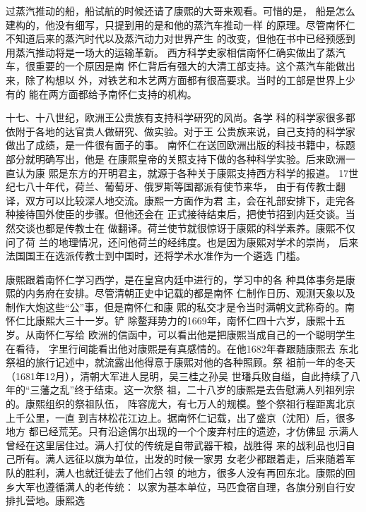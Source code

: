 过蒸汽推动的船，船试航的时候还请了康熙的大哥来观看。可惜的是，%
船是怎么建构的，他没有细写，只提到用的是和他的蒸汽车推动一样%
的原理。尽管南怀仁不知道后来的蒸汽时代以及蒸汽动力对世界产生%
的改变，但他在书中已经预感到用蒸汽推动将是一场大的运输革新。%
西方科学史家相信南怀仁确实做出了蒸汽车，很重要的一个原因是南%
怀仁背后有强大的大清工部支持。这个蒸汽车能做出来，除了构想以%
外，对铁艺和木艺两方面都有很高要求。当时的工部是世界上少有的%
能在两方面都给予南怀仁支持的机构。%
\par
十七、十八世纪，欧洲王公贵族有支持科学研究的风尚。各学%
科的科学家很多都依附于各地的达官贵人做研究、做实验。对于王%
公贵族来说，自己支持的科学家做出了成绩，是一件很有面子的事。%
南怀仁在送回欧洲出版的科技书籍中，标题部分就明确写出，他是%
在康熙皇帝的关照支持下做的各种科学实验。后来欧洲一直认为康%
熙是东方的开明君主，就源于各种关于康熙支持西方科学的报道。%
17世纪七八十年代，荷兰、葡萄牙、俄罗斯等国都派有使节来华，%
由于有传教士翻译，双方可以比较深人地交流。康熙一方面作为君%
主，会在礼部安排下，走完各种接待国外使臣的步骤。但他还会在%
正式接待结束后，把使节招到内廷交谈。当然交谈也都是传教士在%
做翻译。荷兰使节就很惊讶于康熙的科学素养。康熙不仅问了荷%
兰的地理情况，还问他荷兰的经纬度。也是因为康熙对学术的崇尚，%
后来法国国王在选派传教士到中国时，还将学术水准作为一个遴选%
门槛。%
\par
康熙跟着南怀仁学习西学，是在皇宫内廷中进行的，学习中的各%
种具体事务是康熙的内务府在安排。尽管清朝正史中记载的都是南怀%
仁制作日历、观测天象以及制作大炮这些“公”事，但是南怀仁和康%
熙的私交才是令当时满朝文武称奇的。南怀仁比康熙大三十一岁。铲%
除鳌拜势力的1669年，南怀仁四十六岁，康熙十五岁。从南怀仁写给%
欧洲的信函中，可以看出他是把康熙当成自己的一个聪明学生在看待，%
字里行间能看出他对康熙是有真感情的。在他1682年春跟随康熙去%
东北祭祖的旅行记述中，就流露出他得意于康熙对他的各种照顾。祭%
祖前一年的冬天（1681年12月），清朝大军进人昆明，吴三桂之孙吴%
世璠兵败自缢，自此持续了八年的“三藩之乱”终于结束。这一次祭%
祖，二十八岁的康熙是去告慰满人列祖列宗的。康熙组织的祭祖队伍，%
阵容庞大，有七万人的规模。整个祭祖行程距离北京上千公里，一直%
到吉林松花江边上。据南怀仁记载，出了盛京（沈阳）后，很多地方%
都已经荒芜。只有沿途偶尔出现的一个个废弃村庄的遗迹，才仿佛显%
示满人曾经在这里居住过。满人打仗的传统是自带武器干粮，战胜得%
来的战利品也归自己所有。满人远征以旗为单位，出发的时候一家男%
女老少都跟着走，后来随着军队的胜利，满人也就迁徙去了他们占领%
的地方，很多人没有再回东北。康熙的回乡大军也遵循满人的老传统：%
以家为基本单位，马匹食宿自理，各旗分别自行安排扎营地。康熙选%
